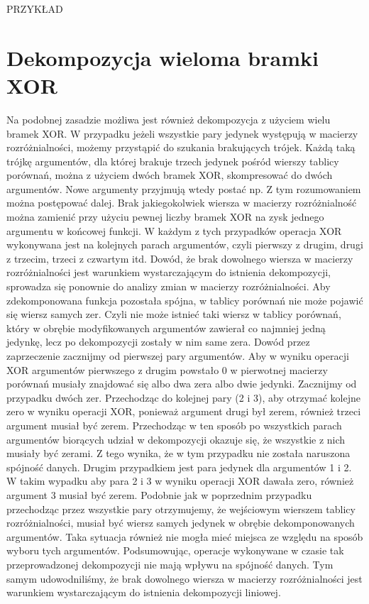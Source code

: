 PRZYKŁAD


\section{Dekompozycja wieloma bramki XOR}

Na podobnej zasadzie możliwa jest również dekompozycja z użyciem wielu bramek XOR. W przypadku jeżeli wszystkie pary jedynek występują w macierzy rozróżnialności, możemy przystąpić do szukania brakujących trójek. Każdą taką trójkę argumentów, dla której brakuje trzech jedynek pośród wierszy tablicy porównań, można z użyciem dwóch bramek XOR, skompresować do dwóch argumentów. Nowe argumenty przyjmują wtedy postać np.
 Z tym rozumowaniem można postępować dalej. Brak jakiegokolwiek wiersza w macierzy rozróżnialność można zamienić przy użyciu pewnej liczby bramek XOR na zysk jednego argumentu w końcowej funkcji. W każdym z tych przypadków operacja XOR wykonywana jest na kolejnych parach argumentów, czyli pierwszy z drugim, drugi z trzecim, trzeci z czwartym itd.
Dowód, że brak dowolnego wiersza w macierzy rozróżnialności jest warunkiem wystarczającym do istnienia dekompozycji, sprowadza się ponownie do analizy zmian w macierzy rozróżnialności. Aby zdekomponowana funkcja pozostała spójna, w tablicy porównań nie może pojawić się wiersz samych zer. Czyli nie może istnieć taki wiersz w tablicy porównań, który w obrębie modyfikowanych argumentów zawierał co najmniej jedną jedynkę, lecz po dekompozycji zostały w nim same zera.
Dowód przez zaprzeczenie zacznijmy od pierwszej pary argumentów. Aby w wyniku operacji XOR argumentów pierwszego z drugim powstało 0 w pierwotnej macierzy porównań musiały znajdować się albo dwa zera albo dwie jedynki.
Zacznijmy od przypadku dwóch zer. Przechodząc do kolejnej pary (2 i 3), aby otrzymać kolejne zero w wyniku operacji XOR, ponieważ argument drugi był zerem, również trzeci argument musiał być zerem. Przechodząc w ten sposób po wszystkich parach argumentów biorących udział w dekompozycji okazuje się, że wszystkie z nich musiały być zerami. Z tego wynika, że w tym przypadku nie została naruszona spójność danych.
Drugim przypadkiem jest para jedynek dla argumentów 1 i 2. W takim wypadku aby para 2 i 3 w wyniku operacji XOR dawała zero, również argument 3 musiał być zerem. Podobnie jak w poprzednim przypadku przechodząc przez wszystkie pary otrzymujemy, że wejściowym wierszem tablicy rozróżnialności, musiał być wiersz samych jedynek w obrębie dekomponowanych argumentów. Taka sytuacja również nie mogła mieć miejsca ze względu na sposób wyboru tych argumentów.
Podsumowując, operacje wykonywane w czasie tak przeprowadzonej dekompozycji nie mają wpływu na spójność danych. Tym samym udowodniliśmy, że brak dowolnego wiersza w macierzy rozróżnialności jest warunkiem wystarczającym do istnienia dekompozycji liniowej.

